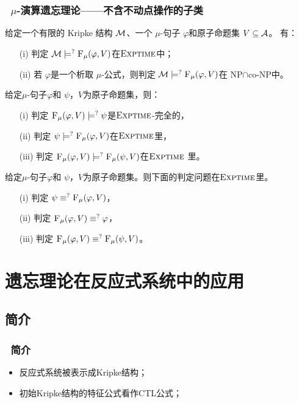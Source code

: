 \documentclass[9pt, CJK]{beamer}
\begin{document}
\begin{frame}
	\frametitle{~$\mu$-演算遗忘理论——{\footnotesize 不含不动点操作的子类}}
	{\footnotesize
	\begin{proposition}[模型检测]\label{chapter06:pro:MC}
		给定一个有限的 Kripke 结构  ${\cal M}$、一个 $\mu$-句子 $\varphi$和原子命题集 $V\subseteq {\cal A}$。 有：
		\begin{itemize}
			\item[(i)] 判定 ${\cal M} \models^? {\textsc{F}_{\textsc{$\mu$}}}(\varphi, V)$在$\textsc{Exptime}$中；
			\item[(ii)] 若 $\varphi$是一个析取 $\mu$-公式，则判定 ${\cal M} \models^? {\textsc{F}_{\textsc{$\mu$}}}(\varphi, V)$在 \textsc{NP}$\cap$co-\textsc{NP}中。
		\end{itemize}
	\end{proposition}

\begin{theorem}[Entailment]
	\label{thm:Ent}
	给定$\mu$-句子$\varphi$和 $\psi$，$V$为原子命题集，则：
	\begin{itemize}
		\item[(i)] 判定 ${\textsc{F}_{\textsc{$\mu$}}}(\varphi, V ) \models^? \psi$是$\textsc{Exptime}$-完全的，
		\item[(ii)] 判定 $\psi \models^? {\textsc{F}_{\textsc{$\mu$}}}(\varphi, V)$在$\textsc{Exptime}$里，
		\item[(iii)] 判定 ${\textsc{F}_{\textsc{$\mu$}}}(\varphi, V) \models^? {\textsc{F}_{\textsc{$\mu$}}}(\psi, V)$在$\textsc{Exptime}$ 里。
	\end{itemize}
\end{theorem}

\begin{corollary}\label{chapter06:cor:equiv}
	给定$\mu$-句子$\varphi$和 $\psi$，$V$为原子命题集。则下面的判定问题在$\textsc{Exptime}$里。
	\begin{itemize}
		\item[(i)] 判定 $\psi \equiv^?{\textsc{F}_{\textsc{$\mu$}}}(\varphi, V)$，
		\item[(ii)] 判定 ${\textsc{F}_{\textsc{$\mu$}}}(\varphi, V) \equiv^? \varphi$，
		\item[(iii)] 判定 ${\textsc{F}_{\textsc{$\mu$}}}(\varphi, V) \equiv^? {\textsc{F}_{\textsc{$\mu$}}}(\psi, V)$。
	\end{itemize}
\end{corollary}
}
\end{frame}

\section{遗忘理论在反应式系统中的应用}
\subsection{简介}
\begin{frame}
	\frametitle{~简介}
	\begin{itemize}
		\item 反应式系统被表示成Kripke结构；
		\item 初始Kripke结构的特征公式看作CTL公式；
	\end{itemize}
\end{frame}
\end{document}
